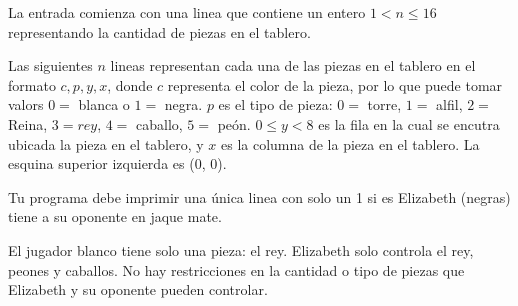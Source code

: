 \documentclass{oci}
\begin{document}
\begin{inputDescription}
    La entrada comienza con una linea que contiene un entero $ 1 < n
    \leq 16$ representando la cantidad de piezas en el tablero.

    Las siguientes $n$ lineas representan cada una de las piezas en el
    tablero en el formato $c, p, y, x$, donde $c$ representa el color
    de la pieza, por lo que puede tomar valors $0 = $ blanca o $1
    = $ negra. $p$ es el tipo de pieza: $0 =$ torre, $1 = $ alfil, $2
    = $ Reina, $3 = rey$, $4 = $ caballo, $5 = $ peón. $0 \leq y < 8$ es la fila en
    la cual se encutra ubicada la pieza en el tablero, y $x$ es la
    columna de la pieza en el tablero. La esquina superior izquierda
    es (0, 0).
\end{inputDescription}

\begin{outputDescription}
    Tu programa debe imprimir una única linea con solo un 1 si es
    Elizabeth (negras) tiene a su oponente en jaque mate.
\end{outputDescription}

\begin{scoreDescription}
  El jugador blanco tiene solo una pieza: el rey.
  Elizabeth solo controla el rey, peones y caballos.
  No hay restricciones en la cantidad o tipo de piezas que Elizabeth y
  su oponente pueden controlar.
\end{scoreDescription}

\begin{sampleDescription}
\end{sampleDescription}
\end{document}
